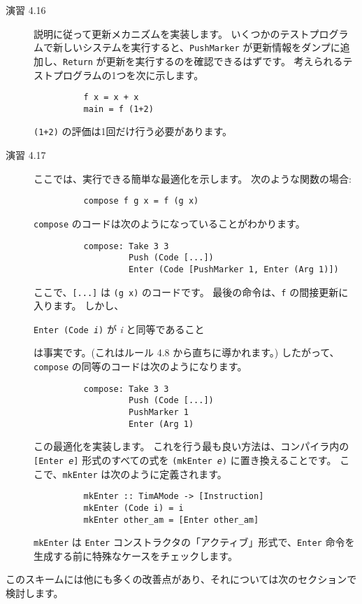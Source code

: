 \documentclass{jarticle}
\begin{document}
\begin{description}
	\item[演習 4.16] 説明に従って更新メカニズムを実装します。
		いくつかのテストプログラムで新しいシステムを実行すると、\texttt{PushMarker} が更新情報をダンプに追加し、\texttt{Return} が更新を実行するのを確認できるはずです。
		考えられるテストプログラムの1つを次に示します。
		\begin{verbatim}
          f x = x + x
          main = f (1+2)
        \end{verbatim}
		\texttt{(1+2)} の評価は1回だけ行う必要があります。
	\item[演習 4.17] ここでは、実行できる簡単な最適化を示します。
		次のような関数の場合:
		\begin{verbatim}
          compose f g x = f (g x)
        \end{verbatim}
		\texttt{compose} のコードは次のようになっていることがわかります。
		\begin{verbatim}
          compose: Take 3 3
                   Push (Code [...])
                   Enter (Code [PushMarker 1, Enter (Arg 1)])
        \end{verbatim}
		ここで、\texttt{[...]} は \texttt{(g x)} のコードです。
		最後の命令は、\texttt{f} の間接更新に入ります。
		しかし、
		\begin{center}
			\texttt{Enter (Code \textit{i})} が \textit{i} と同等であること
		\end{center}
		は事実です。(これはルール 4.8 から直ちに導かれます。)
		したがって、\texttt{compose} の同等のコードは次のようになります。
		\begin{verbatim}
          compose: Take 3 3
                   Push (Code [...])
                   PushMarker 1
                   Enter (Arg 1)
        \end{verbatim}
		この最適化を実装します。
		これを行う最も良い方法は、コンパイラ内の \texttt{[Enter \textit{e}]} 形式のすべての式を \texttt{(mkEnter \textit{e})} に置き換えることです。
		ここで、\texttt{mkEnter} は次のように定義されます。
		\begin{verbatim}
          mkEnter :: TimAMode -> [Instruction]
          mkEnter (Code i) = i
          mkEnter other_am = [Enter other_am]
        \end{verbatim}
		\texttt{mkEnter} は \texttt{Enter} コンストラクタの「アクティブ」形式で、\texttt{Enter} 命令を生成する前に特殊なケースをチェックします。
\end{description}

このスキームには他にも多くの改善点があり、それについては次のセクションで検討します。
\end{document}
